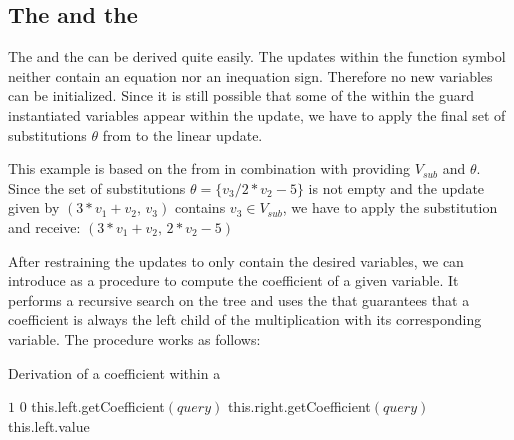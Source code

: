 \subsection{The \updatematrix and the \updateconstants}
\label{sec:derivation-update}
The \updatematrix and the \updateconstants can be derived quite easily. The updates within the function symbol neither contain an equation nor an inequation sign. Therefore no new variables can be initialized. Since it is still possible that some of the within the guard instantiated variables appear within the update, we have to apply the final set of substitutions $\theta$ from  to the linear update. 

\begin{example}
	\label{ex:derivation-update-sub}
	This example is based on the \its from  in combination with  providing $V_{sub}$ and $\theta$. \newline
	Since the set of substitutions $\theta=\{v_3/2*v_2-5\}$ is not empty and the update given by\newline
	\hspace*{.4\textwidth}$(3*v_1+v_2\text{, } v_3)$\newline
	contains $v_3 \in V_{sub}$, we have to apply the substitution and receive:\newline
	\hspace*{.37\textwidth}$(3*v_1+v_2\text{, }2*v_2-5)$
\end{example}

After restraining the updates to only contain the desired variables, we can introduce  as a procedure to compute the coefficient of a given variable. It performs a recursive search on the tree and uses the \stdLinInt that guarantees that a coefficient is always the left child of the multiplication with its corresponding variable. The procedure works as follows:
\begin{algorithm}[H]
	\caption{Derivation of a coefficient within a \rpntree}
	\label{algo:coefficient}
	\begin{algorithmic}[1]
				\State \Return $1$
			 
				\State \Return $0$
			\EndIf
			\State
			 
					\State \Return this.left.getCoefficient$(query)$
				\Else
					\State \Return this.right.getCoefficient$(query)$
				\EndIf
			\EndIf
			 
					\State \Return this.left.value
				\EndIf				
			\EndIf
		\EndFunction
	\end{algorithmic}
\end{algorithm}

